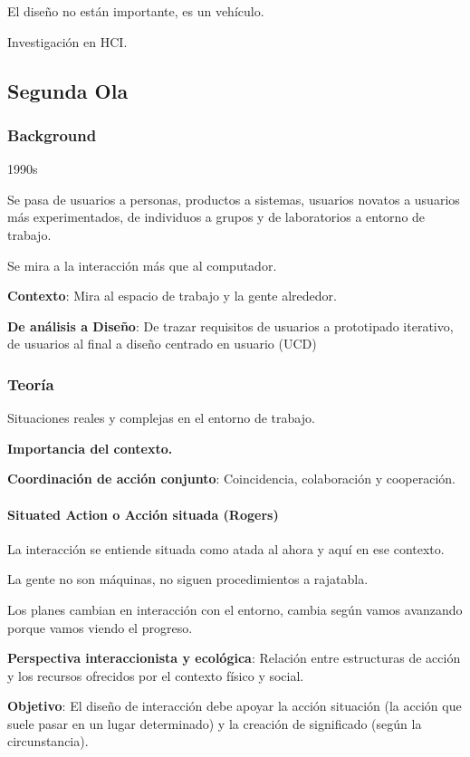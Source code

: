 \documentclass[12pt]{report} %
\begin{document}
El diseño no están importante, es un vehículo.

Investigación en HCI.

\subsection{Segunda Ola}

\subsubsection{Background}

1990s

Se pasa de usuarios a personas, productos a sistemas, usuarios novatos a
usuarios más experimentados, de individuos a grupos y de laboratorios a
entorno de trabajo.

Se mira a la interacción más que al computador.

\textbf{Contexto}: Mira al espacio de trabajo y la gente alrededor.

\textbf{De análisis a Diseño}: De trazar requisitos de usuarios a
prototipado iterativo, de usuarios al final a diseño centrado en usuario
(UCD)

\subsubsection{Teoría}

Situaciones reales y complejas en el entorno de trabajo.

\textbf{Importancia del contexto.}

\textbf{Coordinación de acción conjunto}: Coincidencia, colaboración y
cooperación.

\paragraph{Situated Action o Acción situada (Rogers)}

La interacción se entiende situada como atada al ahora y aquí en ese
contexto.

La gente no son máquinas, no siguen procedimientos a rajatabla.

Los planes cambian en interacción con el entorno, cambia según vamos
avanzando porque vamos viendo el progreso.

\textbf{Perspectiva interaccionista y ecológica}: Relación entre
estructuras de acción y los recursos ofrecidos por el contexto físico y
social.

\textbf{Objetivo}: El diseño de interacción debe apoyar la acción
situación (la acción que suele pasar en un lugar determinado) y la
creación de significado (según la circunstancia).
\end{document}

